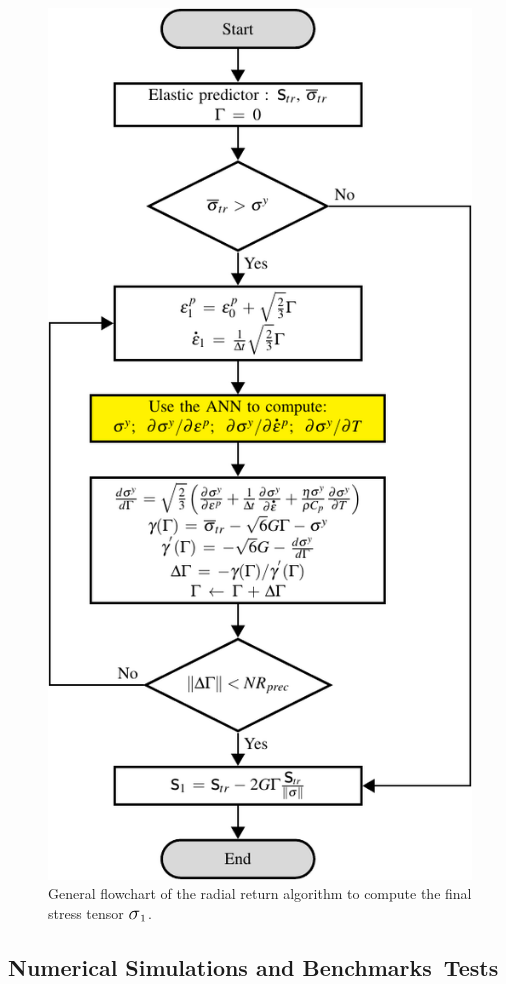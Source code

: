\documentclass[algorithms,article,accept,pdftex,moreauthors]{Definitions/mdpi}
\DeclareRobustCommand{\Sig}{\mbox{\Large\ensuremath{\sigma}}}
\begin{document}
\begin{figure}[H]
\includegraphics[width=0.6\columnwidth]{Figures/VumatGeneralNewtonRaphson}
\caption{General flowchart of the radial return algorithm to compute the final stress tensor $\Sig_1$.}
\label{fig:RadialReturn}
\end{figure}
\unskip

\subsection{Numerical Simulations and Benchmarks~Tests}\label{sec:Simulations}
\end{document}

